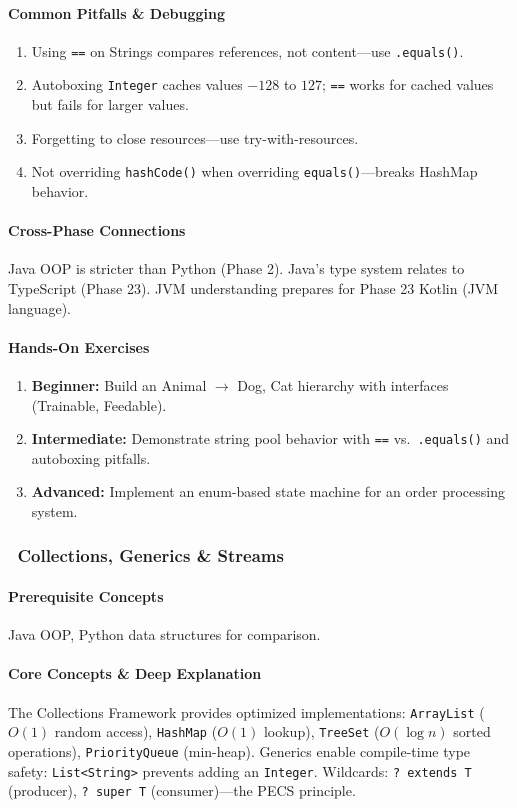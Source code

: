 \documentclass[11pt, a4paper, oneside]{report}
\newcommand{\mustmaster}[1]{\subsubsection{\texorpdfstring{\fcolorbox{blue!40!black}{blue!8}{\footnotesize\bfseries\color{blue!40!black} MUST MASTER}~#1}{#1}}}
\newcommand{\arrow}{$\rightarrow$}
\begin{document}
\paragraph{Common Pitfalls \& Debugging}
\begin{enumerate}[leftmargin=*]
\item Using \texttt{==} on Strings compares references, not content---use \texttt{.equals()}.
\item Autoboxing \texttt{Integer} caches values $-128$ to $127$; \texttt{==} works for cached values but fails for larger values.
\item Forgetting to close resources---use try-with-resources.
\item Not overriding \texttt{hashCode()} when overriding \texttt{equals()}---breaks HashMap behavior.
\end{enumerate}

\paragraph{Cross-Phase Connections} Java OOP is stricter than Python (Phase 2). Java's type system relates to TypeScript (Phase 23). JVM understanding prepares for Phase 23 Kotlin (JVM language).

\paragraph{Hands-On Exercises}
\begin{enumerate}[leftmargin=*]
\item \textbf{Beginner:} Build an Animal \arrow{} Dog, Cat hierarchy with interfaces (Trainable, Feedable).
\item \textbf{Intermediate:} Demonstrate string pool behavior with \texttt{==} vs.\ \texttt{.equals()} and autoboxing pitfalls.
\item \textbf{Advanced:} Implement an enum-based state machine for an order processing system.
\end{enumerate}

\mustmaster{Collections, Generics \& Streams}

\paragraph{Prerequisite Concepts} Java OOP, Python data structures for comparison.

\paragraph{Core Concepts \& Deep Explanation} The Collections Framework provides optimized implementations: \texttt{ArrayList} ($O(1)$ random access), \texttt{HashMap} ($O(1)$ lookup), \texttt{TreeSet} ($O(\log n)$ sorted operations), \texttt{PriorityQueue} (min-heap). Generics enable compile-time type safety: \texttt{List<String>} prevents adding an \texttt{Integer}. Wildcards: \texttt{? extends T} (producer), \texttt{? super T} (consumer)---the PECS principle.
\end{document}
